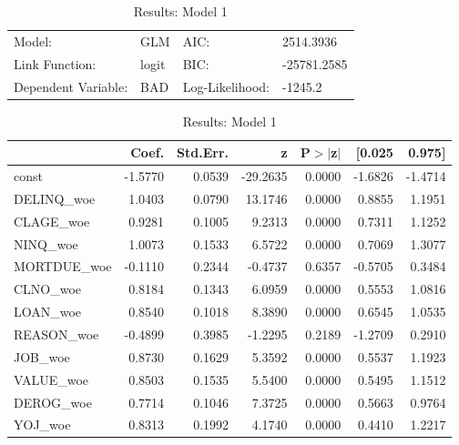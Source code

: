 \begin{table}[H]
\renewcommand{\arraystretch}{1.25}
\begin{center}
\begin{tabular}{llll}
\hline
Model:              & GLM              & AIC:            & 2514.3936    \\
Link Function:      & logit            & BIC:            & -25781.2585  \\
Dependent Variable: & BAD              & Log-Likelihood: & -1245.2      \\
\hline
\end{tabular}
\end{center}
\begin{center}
\begin{tabular}{lrrrrrr}
\hline
             &  Coef.  & Std.Err. &    z     & P$> |$z$|$ &  [0.025 &  0.975]  \\
\hline
\hline
const        & -1.5770 &   0.0539 & -29.2635 &      0.0000 & -1.6826 & -1.4714  \\
DELINQ\_woe  &  1.0403 &   0.0790 &  13.1746 &      0.0000 &  0.8855 &  1.1951  \\
CLAGE\_woe   &  0.9281 &   0.1005 &   9.2313 &      0.0000 &  0.7311 &  1.1252  \\
NINQ\_woe    &  1.0073 &   0.1533 &   6.5722 &      0.0000 &  0.7069 &  1.3077  \\
MORTDUE\_woe & -0.1110 &   0.2344 &  -0.4737 &      0.6357 & -0.5705 &  0.3484  \\
CLNO\_woe    &  0.8184 &   0.1343 &   6.0959 &      0.0000 &  0.5553 &  1.0816  \\
LOAN\_woe    &  0.8540 &   0.1018 &   8.3890 &      0.0000 &  0.6545 &  1.0535  \\
REASON\_woe  & -0.4899 &   0.3985 &  -1.2295 &      0.2189 & -1.2709 &  0.2910  \\
JOB\_woe     &  0.8730 &   0.1629 &   5.3592 &      0.0000 &  0.5537 &  1.1923  \\
VALUE\_woe   &  0.8503 &   0.1535 &   5.5400 &      0.0000 &  0.5495 &  1.1512  \\
DEROG\_woe   &  0.7714 &   0.1046 &   7.3725 &      0.0000 &  0.5663 &  0.9764  \\
YOJ\_woe     &  0.8313 &   0.1992 &   4.1740 &      0.0000 &  0.4410 &  1.2217  \\
\hline
\end{tabular}
\end{center}
\caption{Results: Model 1 \label{table:results_1}}
\end{table}

